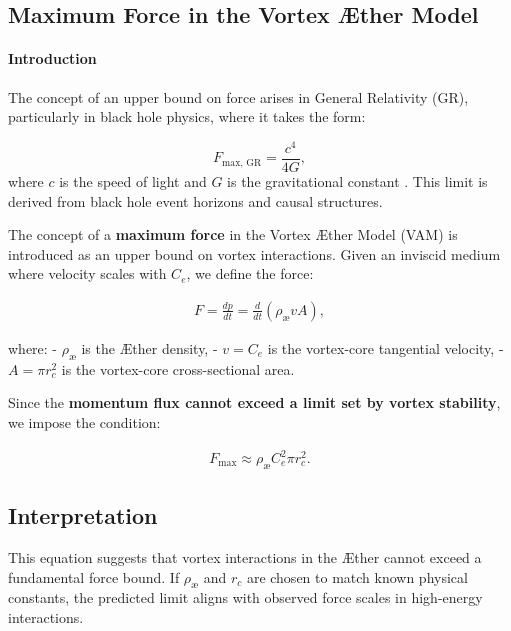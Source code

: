 

\subsection{Maximum Force in the Vortex Æther Model}


\paragraph*{Introduction}
The concept of an upper bound on force arises in General Relativity (GR), particularly in black hole physics, where it takes the form:


\begin{equation*}
    F_\text{max, GR} = \frac{c^4}{4G},
\end{equation*}
where $c$ is the speed of light and $G$ is the gravitational constant \cite{Schiller2006}. This limit is derived from black hole event horizons and causal structures.


The concept of a \textbf{maximum force} in the Vortex Æther Model (VAM) is introduced as an upper bound on vortex interactions. Given an inviscid medium where velocity scales with \( C_e \), we define the force:

\begin{align}
    F = \frac{dp}{dt} = \frac{d}{dt} (\rho_{\text{\ae}} v A),
\end{align}

where:
- \( \rho_{\text{\ae}} \) is the Æther density,
- \( v = C_e \) is the vortex-core tangential velocity,
- \( A = \pi r_c^2 \) is the vortex-core cross-sectional area.

Since the \textbf{momentum flux cannot exceed a limit set by vortex stability}, we impose the condition:

\begin{align}
    F_{\max} \approx \rho_{\text{\ae}} C_e^2 \pi r_c^2.
\end{align}

\subsection{Interpretation}

This equation suggests that vortex interactions in the Æther cannot exceed a fundamental force bound. If \( \rho_{\text{\ae}} \) and \( r_c \) are chosen to match known physical constants, the predicted limit aligns with observed force scales in high-energy interactions.


